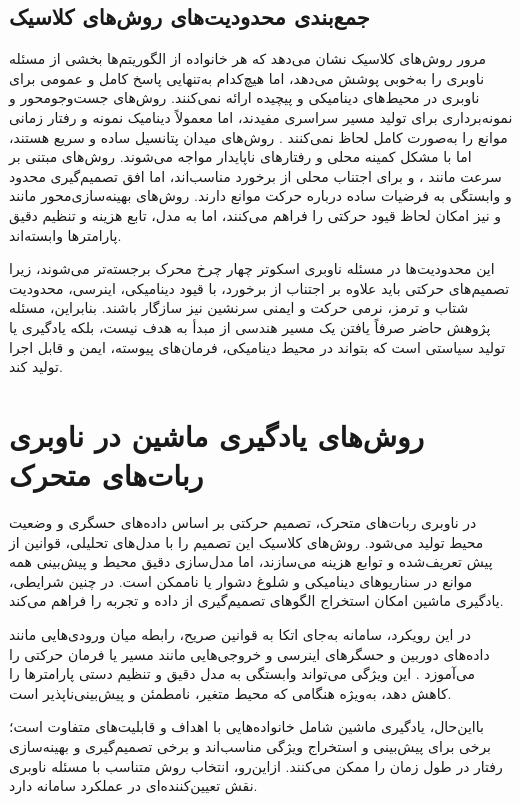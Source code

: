 \subsection{جمع‌بندی محدودیت‌های روش‌های کلاسیک}

مرور روش‌های کلاسیک نشان می‌دهد که هر خانواده از الگوریتم‌ها بخشی از مسئله ناوبری را به‌خوبی پوشش می‌دهد، اما هیچ‌کدام به‌تنهایی پاسخ کامل و عمومی برای ناوبری در محیط‌های دینامیکی و پیچیده ارائه نمی‌کنند. روش‌های جست‌وجومحور و نمونه‌برداری برای تولید مسیر سراسری مفیدند، اما معمولاً دینامیک نمونه و رفتار زمانی موانع را به‌صورت کامل لحاظ نمی‌کنند %
\cite{s25113394,alvarez2024DRLsurvey}. %
 روش‌های میدان پتانسیل ساده و سریع هستند، اما با مشکل کمینه محلی و رفتارهای ناپایدار مواجه می‌شوند. روش‌های مبتنی بر سرعت مانند ،  و  برای اجتناب محلی از برخورد مناسب‌اند، اما افق تصمیم‌گیری محدود و وابستگی به فرضیات ساده درباره حرکت موانع دارند. روش‌های بهینه‌سازی‌محور مانند  و  نیز امکان لحاظ قیود حرکتی را فراهم می‌کنند، اما به مدل، تابع هزینه و تنظیم دقیق پارامترها وابسته‌اند.

این محدودیت‌ها در مسئله ناوبری اسکوتر چهار چرخ محرک برجسته‌تر می‌شوند، زیرا تصمیم‌های حرکتی باید علاوه بر اجتناب از برخورد، با قیود دینامیکی، اینرسی، محدودیت شتاب و ترمز، نرمی حرکت و ایمنی سرنشین نیز سازگار باشند. بنابراین، مسئله پژوهش حاضر صرفاً یافتن یک مسیر هندسی از مبدأ به هدف نیست، بلکه یادگیری یا تولید سیاستی است که بتواند در محیط دینامیکی، فرمان‌های پیوسته، ایمن و قابل اجرا تولید کند.

\section{روش‌های یادگیری ماشین در ناوبری ربات‌های متحرک}

در ناوبری ربات‌های متحرک، تصمیم حرکتی بر اساس داده‌های حسگری و وضعیت محیط تولید می‌شود. روش‌های کلاسیک این تصمیم را با مدل‌های تحلیلی، قوانین از پیش تعریف‌شده و توابع هزینه می‌سازند، اما مدل‌سازی دقیق محیط و پیش‌بینی همه موانع در سناریوهای دینامیکی و شلوغ دشوار یا ناممکن است. در چنین شرایطی، یادگیری ماشین امکان استخراج الگوهای تصمیم‌گیری از داده و تجربه را فراهم می‌کند.

در این رویکرد، سامانه به‌جای اتکا به قوانین صریح، رابطه میان ورودی‌هایی مانند داده‌های دوربین و حسگرهای اینرسی و خروجی‌هایی مانند مسیر یا فرمان حرکتی را می‌آموزد %
\cite{Zhu2021}. %
این ویژگی می‌تواند وابستگی به مدل دقیق و تنظیم دستی پارامترها را کاهش دهد، به‌ویژه هنگامی که محیط متغیر، نامطمئن و پیش‌بینی‌ناپذیر است.

بااین‌حال، یادگیری ماشین شامل خانواده‌هایی با اهداف و قابلیت‌های متفاوت است؛ برخی برای پیش‌بینی و استخراج ویژگی مناسب‌اند و برخی تصمیم‌گیری و بهینه‌سازی رفتار در طول زمان را ممکن می‌کنند. ازاین‌رو، انتخاب روش متناسب با مسئله ناوبری نقش تعیین‌کننده‌ای در عملکرد سامانه دارد.

